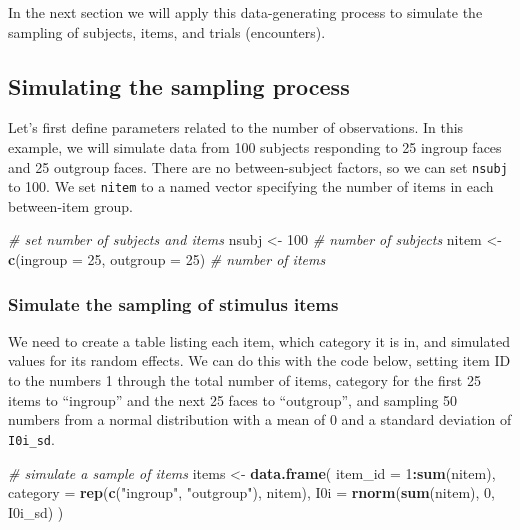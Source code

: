 \documentclass[doc,floatsintext]{apa6}
\newenvironment{Shaded}{\begin{snugshade}}{\end{snugshade}}
\newcommand{\KeywordTok}[1]{\textcolor[rgb]{0.13,0.29,0.53}{\textbf{#1}}}
\newcommand{\DataTypeTok}[1]{\textcolor[rgb]{0.13,0.29,0.53}{#1}}
\newcommand{\DecValTok}[1]{\textcolor[rgb]{0.00,0.00,0.81}{#1}}
\newcommand{\StringTok}[1]{\textcolor[rgb]{0.31,0.60,0.02}{#1}}
\newcommand{\CommentTok}[1]{\textcolor[rgb]{0.56,0.35,0.01}{\textit{#1}}}
\newcommand{\OperatorTok}[1]{\textcolor[rgb]{0.81,0.36,0.00}{\textbf{#1}}}
\newcommand{\NormalTok}[1]{#1}
\begin{document}
\noindent In the next section we will apply this data-generating process
to simulate the sampling of subjects, items, and trials (encounters).

\subsection{Simulating the sampling
process}\label{simulating-the-sampling-process}

Let's first define parameters related to the number of observations. In
this example, we will simulate data from 100 subjects responding to 25
ingroup faces and 25 outgroup faces. There are no between-subject
factors, so we can set \texttt{nsubj} to 100. We set \texttt{nitem} to a
named vector specifying the number of items in each between-item group.

\begin{Shaded}
\begin{Highlighting}[]
\CommentTok{# set number of subjects and items}
\NormalTok{nsubj  <-}\StringTok{ }\DecValTok{100} \CommentTok{# number of subjects}
\NormalTok{nitem  <-}\StringTok{ }\KeywordTok{c}\NormalTok{(}\DataTypeTok{ingroup =} \DecValTok{25}\NormalTok{, }\DataTypeTok{outgroup =} \DecValTok{25}\NormalTok{)  }\CommentTok{# number of items}
\end{Highlighting}
\end{Shaded}

\subsubsection{Simulate the sampling of stimulus
items}\label{simulate-the-sampling-of-stimulus-items}

We need to create a table listing each item, which category it is in,
and simulated values for its random effects. We can do this with the
code below, setting item ID to the numbers 1 through the total number of
items, category for the first 25 items to \enquote{ingroup} and the next
25 faces to \enquote{outgroup}, and sampling 50 numbers from a normal
distribution with a mean of 0 and a standard deviation of
\texttt{I0i\_sd}.

\begin{Shaded}
\begin{Highlighting}[]
\CommentTok{# simulate a sample of items}
\NormalTok{items <-}\StringTok{ }\KeywordTok{data.frame}\NormalTok{(}
  \DataTypeTok{item_id =} \DecValTok{1}\OperatorTok{:}\KeywordTok{sum}\NormalTok{(nitem),}
  \DataTypeTok{category =} \KeywordTok{rep}\NormalTok{(}\KeywordTok{c}\NormalTok{(}\StringTok{"ingroup"}\NormalTok{, }\StringTok{"outgroup"}\NormalTok{), nitem),}
  \DataTypeTok{I0i =} \KeywordTok{rnorm}\NormalTok{(}\KeywordTok{sum}\NormalTok{(nitem), }\DecValTok{0}\NormalTok{, I0i_sd)}
\NormalTok{)}
\end{Highlighting}
\end{Shaded}
\end{document}

